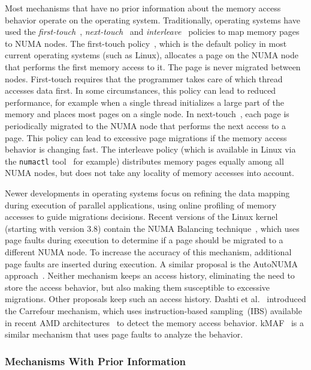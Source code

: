 Most mechanisms that have no prior information about the memory access behavior operate on the operating system.
Traditionally, operating systems have used the \emph{first-touch}~\cite{Marchetti1995}, \emph{next-touch}~\cite{Lof2005} and \emph{interleave}~\cite{Kleen2004} policies to map memory pages to NUMA nodes.
The first-touch policy~\cite{Marchetti1995}, which is the default policy in most current operating systems (such as Linux), allocates a page on the NUMA node that performs the first memory access to it.
The page is never migrated between nodes.
First-touch requires that the programmer takes care of which thread accesses data first.
In some circumstances, this policy can lead to reduced performance, for example when a single thread initializes a large part of the memory and places most pages on a single node.
In next-touch~\cite{Lof2005}, each page is periodically migrated to the NUMA node that performs the next access to a page.
This policy can lead to excessive page migrations if the memory access behavior is changing fast.
The interleave policy (which is available in Linux via the \texttt{numactl} tool~\cite{Kleen2004} for example) distributes memory pages equally among all NUMA nodes, but does not take any locality of memory accesses into account.

Newer developments in operating systems focus on refining the data mapping during execution of parallel applications, using online profiling of memory accesses to guide migrations decisions.
Recent versions of the Linux kernel (starting with version 3.8) contain the NUMA Balancing technique~\cite{Corbet}, which uses page faults during execution to determine if a page should be migrated to a different NUMA node. To increase the accuracy of this mechanism, additional page faults are inserted during execution.
A similar proposal is the AutoNUMA approach~\cite{Corbet2012}.
Neither mechanism keeps an access history, eliminating the need to store the access behavior, but also making them susceptible to excessive migrations.
Other proposals keep such an access history.
Dashti et al.~\cite{Dashti2013} introduced the Carrefour mechanism, which uses instruction-based sampling~(IBS) available in recent AMD architectures~\cite{AMD2012} to detect the memory access behavior.
kMAF~\cite{Diener2014} is a similar mechanism that uses page faults to analyze the behavior.


\subsubsection{Mechanisms With Prior Information}

